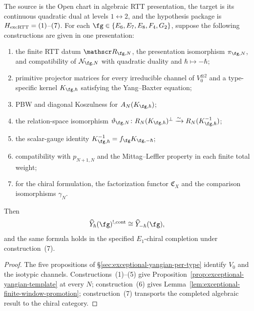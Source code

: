 \begin{theorem}
\label{thm:exceptional-yangian-koszul-duality-all-five-types}
The source is the Open chart in algebraic RTT presentation, the target
is its continuous quadratic dual at levels $1\leftrightarrow2$, and the
hypothesis package is
$H_{\mathrm{excRTT}}=\textup{(1)}$--$\textup{(7)}$.
For each
$\fg\in\{E_6,E_7,E_8,F_4,G_2\}$, suppose the following constructions
are given in one presentation:
\begin{enumerate}[label=\textup{(\arabic*)}]
\item the finite RTT datum $\mathscr R_{\fg,N}$, the presentation
isomorphism $\pi_{\fg,N}$, and compatibility of
$\mathcal N_{\fg,N}$ with quadratic duality and
$\hbar\mapsto-\hbar$;
\item primitive projector matrices for every irreducible channel of
$V_0^{\otimes2}$ and a type-specific kernel $K_{\fg,\hbar}$ satisfying
the Yang--Baxter equation;
\item PBW and diagonal Koszulness for $A_N(K_{\fg,\hbar})$;
\item the relation-space isomorphism
$\vartheta_{\fg,N}\colon R_N(K_{\fg,\hbar})^\perp
\xrightarrow{\sim}R_N(K_{\fg,\hbar}^{-1})$;
\item the scalar-gauge identity
$K_{\fg,\hbar}^{-1}=f_{\fg}K_{\fg,-\hbar}$;
\item compatibility with $p_{N+1,N}$ and the Mittag--Leffler property in
each finite total weight;
\item for the chiral formulation, the factorization functor
$\mathfrak C_X$ and the comparison isomorphisms $\gamma_N$.
\end{enumerate}
Then
\[
\widehat Y_\hbar(\fg)^{!,\mathrm{cont}}
\cong\widehat Y_{-\hbar}(\fg),
\]
and the same formula holds in the specified $E_1$-chiral completion
under construction~\textup{(7)}.
\end{theorem}

\begin{proof}
The five propositions of
\S\ref{sec:exceptional-yangian-per-type} identify $V_0$ and the
isotypic channels.  Constructions~\textup{(1)}--\textup{(5)} give
Proposition~\ref{prop:exceptional-yangian-template} at every $N$;
construction~\textup{(6)} gives
Lemma~\ref{lem:exceptional-finite-window-promotion};
construction~\textup{(7)} transports the completed algebraic result to
the chiral category.
\end{proof}

